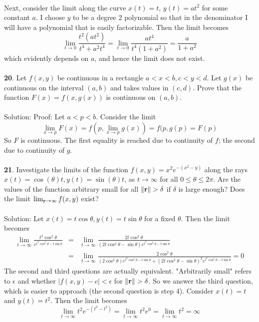 \documentclass[12pt]{amsbook}
\begin{document}
\\
Next, consider the limit along the curve $x(t)=t$, $y(t)=at^2$ for some constant $a$. I choose $y$ to be a degree $2$ polynomial so that in the denominator I will have a polynomial that is easily factorizable. Then the limit becomes
$$\lim_{t \rightarrow 0}\frac{t^2(at^2)}{t^4+a^2t^4}=\lim_{t \rightarrow 0}\frac{at^4}{t^4(1+a^2)}=\frac{a}{1+a^2}$$
which evidently depends on $a$, and hence the limit does not exist.
\\
\\
{\small\bf 20}. Let $f(x, y)$ be continuous in a rectangle $a < x < b, c < y < d$. Let $g(x)$
be continuous on the interval $(a, b)$ and takes values in $(c, d)$. Prove that
the function $F(x) = f(x, g(x))$ is continuous on $(a, b)$.
\\
\\
{\sc Solution}: Proof: Let $a<p<b$. Consider the limit
$$\lim_{x \rightarrow p}F(x)=f(p,\lim_{x \rightarrow p}g(x))=f(p,g(p)=F(p)$$
So $F$ is continuous. The first equality is reached due to continuity of $f$; the second due to continuity of $g$.
\\
\\
{\small\bf 21}. Investigate the limits of the function $f(x, y) = x^2e^{-(x^2-y)} $ along the
rays $x(t) = \cos(\theta)t, y(t) = \sin(\theta)t$, as $t \rightarrow \infty$ for all $0 \leq \theta \leq 2\pi$. Are the values of the function arbitrary small for all $\|{\bf r}\| > \delta$ if $\delta$ is large enough?
Does the limit $\lim_{{\bf r} \rightarrow \infty} f(x, y)$ exist?
\\
\\
{\sc Solution}: Let $x(t)=t\cos \theta, y(t)=t\sin \theta$ for a fixed $\theta$. Then the limit becomes
\begin{eqnarray*}
\lim_{t \rightarrow \infty}  \frac{t^2\cos^2\theta}{e^{t^2\cos^2\theta-t\sin\theta}}&=&\lim_{t \rightarrow \infty} \frac{2t\cos^2\theta}{(2t\cos^2\theta-\sin\theta)e^{t^2\cos^2\theta-t\sin\theta}}\\
&=&\lim_{t \rightarrow \infty} \frac{2\cos^2\theta}{(2\cos^2\theta)e^{t^2\cos^2\theta-t\sin\theta}+(2t\cos^2\theta-\sin\theta)^2e^{t^2\cos^2\theta-t\sin\theta}}=0
\end{eqnarray*}
The second and third questions are actually equivalent. "Arbitrarily small" refers to $\epsilon$ and whether $|f(x,y)-c|<\epsilon$ for $\|{\bf r}\|>\delta$. So we answer the third question, which is easier to approach (the second question is step 4). Consider $x(t)=t$ and $y(t)=t^2$. Then the limit becomes
$$\lim_{t \rightarrow \infty}t^2e^{-(t^2-t^2)}=\lim_{t \rightarrow \infty}t^2e^0=\lim_{t \rightarrow \infty}t^2=\infty$$
\end{document}
